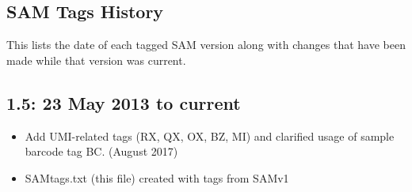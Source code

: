 \documentclass[10pt]{article}
\begin{document}
\begin{appendices}
\appendix
\section{SAM Tags History}\label{sec:history}

This lists the date of each tagged SAM version along with changes that
have been made while that version was current.  

\subsection*{1.5: 23 May 2013 to current}
\begin{itemize}
\item Add UMI-related tags (RX, QX, OX, BZ, MI) and clarified usage of sample barcode tag BC. (August 2017)
\item SAMtags.txt (this file) created with tags from SAMv1 
\end{itemize}

\end{appendices}
\end{document}
